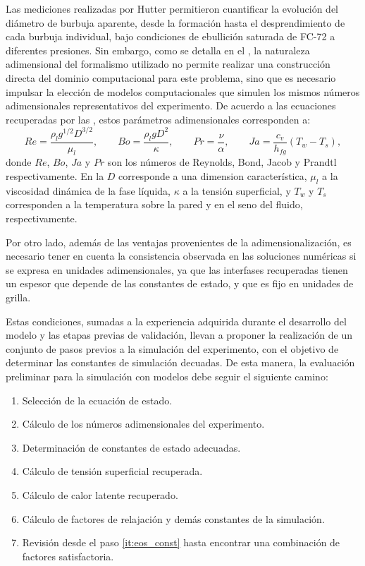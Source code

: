 Las mediciones realizadas por Hutter permitieron cuantificar la evoluci\'on del di\'ametro de burbuja aparente, desde la formaci\'on hasta el desprendimiento de cada burbuja individual, bajo condiciones de ebullici\'on saturada de FC-72 a diferentes presiones. Sin embargo, como se detalla en el , la naturaleza adimensional del formalismo utilizado no permite realizar una construcci\'on directa del dominio computacional para este problema, sino que es necesario impulsar la elecci\'on de modelos computacionales que simulen los mismos n\'umeros adimensionales representativos del experimento. De acuerdo a las ecuaciones recuperadas por las \lbe{}, estos par\'ametros adimensionales corresponden a:
\begin{equation}
	Re = \dfrac{\rho_l g^{1/2} D^{3/2}}{\mu_l}, \qquad
	Bo = \dfrac{\rho_l g D^2}{\kappa}, \qquad
	Pr = \dfrac{\nu}{\alpha}, \qquad
	Ja = \dfrac{c_v}{h_{fg}}(T_w-T_s),
	\label{eq:num_adim_hetb_3D}
\end{equation}
donde $Re$, $Bo$, $Ja$ y $Pr$ son los n\'umeros de Reynolds, Bond, Jacob y Prandtl respectivamente. En la  $D$ corresponde a una dimension caracter\'istica, $\mu_l$ a la viscosidad din\'amica de la fase l\'iquida, $\kappa$ a la tensi\'on superficial, y $T_w$ y $T_s$ corresponden a la temperatura sobre la pared y en el seno del fluido, respectivamente. 

Por otro lado, adem\'as de las ventajas provenientes de la adimensionalizaci\'on, es necesario tener en cuenta la consistencia observada en las soluciones num\'ericas si se expresa en unidades adimensionales, ya que las interfases recuperadas tienen un espesor que depende de las constantes de estado, y que es fijo en unidades de grilla.

Estas condiciones, sumadas a la experiencia adquirida durante el desarrollo del modelo y las etapas previas de validaci\'on, llevan a proponer la realizaci\'on de un conjunto de pasos previos a la simulaci\'on del experimento, con el objetivo de determinar las constantes de simulaci\'on decuadas. De esta manera, la evaluaci\'on preliminar para la simulaci\'on con modelos \pp{} debe seguir el siguiente camino:
\begin{enumerate}
	\item Selecci\'on de la ecuaci\'on de estado.
	\item C\'alculo de los n\'umeros adimensionales del experimento.
	\item Determinaci\'on de constantes de estado adecuadas. \label{it:eos_const}
	\item C\'alculo de tensi\'on superficial recuperada.
	\item C\'alculo de calor latente recuperado.
	\item C\'alculo de factores de relajaci\'on y dem\'as constantes de la simulaci\'on.
	\item Revisi\'on desde el paso \ref{it:eos_const} hasta encontrar una combinaci\'on de factores satisfactoria.
\end{enumerate}


